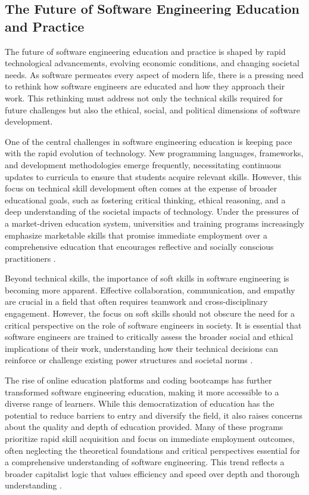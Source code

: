 \begin{refsection}
\subsection{The Future of Software Engineering Education and Practice}

The future of software engineering education and practice is shaped by rapid technological advancements, evolving economic conditions, and changing societal needs. As software permeates every aspect of modern life, there is a pressing need to rethink how software engineers are educated and how they approach their work. This rethinking must address not only the technical skills required for future challenges but also the ethical, social, and political dimensions of software development.

One of the central challenges in software engineering education is keeping pace with the rapid evolution of technology. New programming languages, frameworks, and development methodologies emerge frequently, necessitating continuous updates to curricula to ensure that students acquire relevant skills. However, this focus on technical skill development often comes at the expense of broader educational goals, such as fostering critical thinking, ethical reasoning, and a deep understanding of the societal impacts of technology. Under the pressures of a market-driven education system, universities and training programs increasingly emphasize marketable skills that promise immediate employment over a comprehensive education that encourages reflective and socially conscious practitioners \cite[pp.~45-48]{giroux2019neoliberalism}.

Beyond technical skills, the importance of soft skills in software engineering is becoming more apparent. Effective collaboration, communication, and empathy are crucial in a field that often requires teamwork and cross-disciplinary engagement. However, the focus on soft skills should not obscure the need for a critical perspective on the role of software engineers in society. It is essential that software engineers are trained to critically assess the broader social and ethical implications of their work, understanding how their technical decisions can reinforce or challenge existing power structures and societal norms \cite[pp.~110-113]{noble2018algorithms}.

The rise of online education platforms and coding bootcamps has further transformed software engineering education, making it more accessible to a diverse range of learners. While this democratization of education has the potential to reduce barriers to entry and diversify the field, it also raises concerns about the quality and depth of education provided. Many of these programs prioritize rapid skill acquisition and focus on immediate employment outcomes, often neglecting the theoretical foundations and critical perspectives essential for a comprehensive understanding of software engineering. This trend reflects a broader capitalist logic that values efficiency and speed over depth and thorough understanding \cite[pp.~134-137]{goldin2016race}.


\end{refsection}
